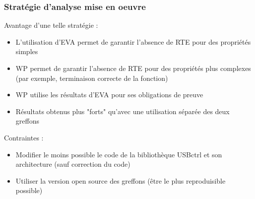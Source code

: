 \documentclass[french]{beamer}
\begin{document}
\begin{frame}
\frametitle{Stratégie d'analyse mise en oeuvre}

Avantage d'une telle stratégie :
\begin{itemize}
	\item L'utilisation d'EVA permet de garantir l'absence de RTE  pour des propriétés simples
	\item WP permet de garantir l'absence de RTE pour des propriétés plus complexes (par exemple, terminaison correcte de la fonction)
	\item WP utilise les résultats d'EVA pour ses obligations de preuve
	\item Résultats obtenus plus "forts" qu'avec une utilisation séparée des deux greffons
\end{itemize}

Contraintes :
\begin{itemize}
	\item Modifier le moins possible le code de la bibliothèque USBctrl et son architecture (sauf correction du code)
	\item Utiliser la version open source des greffons (être le plus reproduisible possible)
\end{itemize}





\end{frame}






\end{document}
